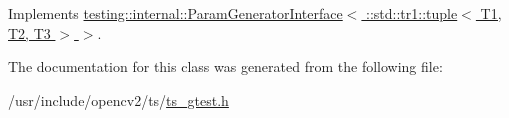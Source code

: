 Implements \hyperlink{classtesting_1_1internal_1_1ParamGeneratorInterface_ae82e6fc79efcef1c794ad333ffb5bf80}{testing\-::internal\-::\-Param\-Generator\-Interface$<$ \-::std\-::tr1\-::tuple$<$ T1, T2, T3 $>$ $>$}.



The documentation for this class was generated from the following file\-:\begin{DoxyCompactItemize}
\item 
/usr/include/opencv2/ts/\hyperlink{ts__gtest_8h}{ts\-\_\-gtest.\-h}\end{DoxyCompactItemize}
